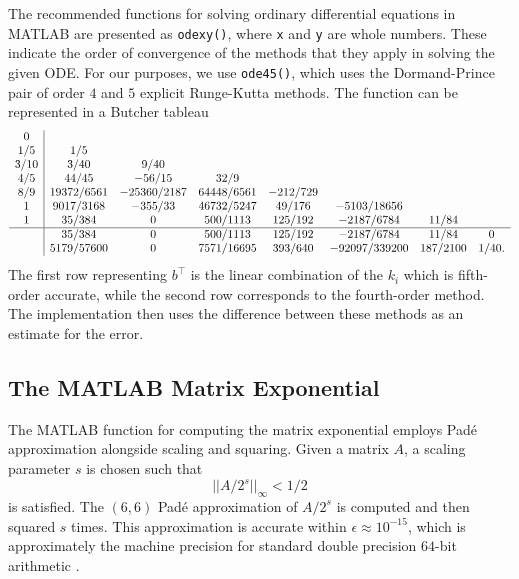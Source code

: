 The recommended functions for solving ordinary differential equations in MATLAB are presented as \texttt{odexy()}, where \texttt{x} and \texttt{y} are whole numbers.
These indicate the order of convergence of the methods that they apply in solving the given ODE.
For our purposes, we use \texttt{ode45()}, which uses the Dormand-Prince pair of order $4$ and $5$ explicit Runge-Kutta methods.
The function can be represented in a Butcher tableau
\begin{equation*}
    \begin{array}{c|ccccccc}
		0 \\
        1/5  & 1/5 & & & & & \\
        3/10 & 3/40 &9/40 & & & & \\ 
        4/5  & 44/45 & -56/15 & 32/9 & & & \\
        8/9  & 19372/6561 & -25360/2187 & 64448/6561 & -212/729 & &  \\
        1    & 9017/3168 & -355/33 	& 46732/5247 	& 49/176 	& -5103/18656 & \\
        1  	 & 35/384 	&0 	& 500/1113 	& 125/192 	& -2187/6784 	& 11/84 \\
		\hline
		& 35/384     & 0 & 500/1113   & 125/192 & -2187/6784    & 11/84    & 0 \\
        & 5179/57600 & 0 & 7571/16695 & 393/640 & -92097/339200 & 187/2100 & 1/40.
	\end{array}
\end{equation*}
The first row representing $b^\top$ is the linear combination of the $k_i$ which is fifth-order accurate, while the second row corresponds to the fourth-order method.
The implementation then uses the difference between these methods as an estimate for the error. %

\subsection{The MATLAB Matrix Exponential}

The MATLAB function for computing the matrix exponential employs Pad\'e approximation alongside scaling and squaring.
Given a matrix $A$, a scaling parameter $s$ is chosen such that
\begin{equation*}
    ||A/{2^s}||_\infty < 1/2
\end{equation*}
is satisfied.
The $(6,6)$ Pad\'e approximation of $A/2^s$ is computed and then squared $s$ times.
This approximation is accurate within $\epsilon \approx 10^{-15}$, which is approximately the machine precision for standard double precision $64$-bit arithmetic \cite{moler2003dubious, higham2005scaling}.

